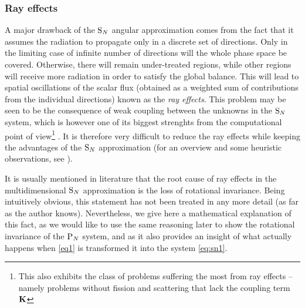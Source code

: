 \subsubsection{Ray effects}
A major drawback of the $\text{S}_{N}$ angular approximation comes from the fact that it assumes the radiation to propagate only
in a discrete set of directions. Only in the limiting case of infinite number of directions will the whole phase space
be covered. Otherwise, there will remain under-treated regions, while other regions will receive more radiation in order
to satisfy the global balance. This will lead to spatial oscillations of the scalar flux (obtained as a weighted sum of
 contributions from the individual directions) known as the \textit{ray effects}. This problem may be seen to be the
consequence of weak coupling between the unknowns in the $\text{S}_{N}$ system, which is however one of its biggest strenghts
from the computational point of view\footnote{This also exhibits the class of problems suffering the most from ray
effects -- namely problems without fission and scattering that lack the coupling term $\mathbf{K}$} .
It is therefore very difficult to reduce the ray effects while keeping the advantages of the $\text{S}_{N}$ approximation (for an
overview and some heuristic observations, see \cite{Li1}). 

It is usually mentioned in literature that the root cause of ray
effects in the multidimensional $\text{S}_{N}$ approximation is the loss of rotational invariance. Being intuitively obvious,
this statement has not been treated in any more detail (as far as the author knows). Nevertheless, we give here a
mathematical explanation of this fact, as we would like to use the same reasoning later to show the rotational 
invariance of the $\text{P}_{N}$ system, and as it also provides an insight of what actually happens when \eqref{eq1} is 
transformed it into the system \eqref{eq:sn1}.

